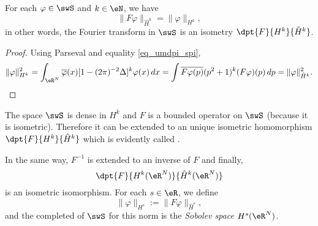 \begin{theorem}
For each $\varphi\in\swS$ and $k\in\eN$, we have
\[ 
  \| F\varphi \|_{\hat H^k}=\| \varphi \|_{H^k},
\]
in other words, the Fourier transform in $\swS$ is an isometry $\dpt{F}{ H^k }{ \hat H^k }$.

\end{theorem}


\begin{proof}
Using Parseval and equality \eqref{eq_umdpi_spi},
\begin{equation}
\| \varphi \|_{H^k}^2=\int_{\eR^N}\overline{ \varphi }(x)[1-(2\pi)^{-2}\Delta]^k\varphi(x)\,dx
		=\int \overline{ F\varphi(p) }(p^2+1)^k(F\varphi)(p)\,dp\\
		=\| \varphi \|_{\hat H^k}^2.
\end{equation}
\end{proof}
The space $\swS$ is dense in $H^k$ and $F$ is a bounded operator on $\swS$ (because it is isometric). Therefore it can be extended to an unique isometric homomorphism $\dpt{ F }{ H^k }{ \hat H^k }$ which is evidently called .


In the same way, $F^{-1}$ is extended to an inverse of $F$ and finally,
\[ 
  \dpt{ F }{ H^k(\eR^N) }{ \hat H^k(\eR^N) }
\]
is  an isometric isomorphism. For each $s\in\eR$, we define
\begin{equation}
  \| \varphi \|_{H^s}:=\| F\varphi \|_{\hat H^s},
\end{equation}
and the completed of $\swS$ for this norm is the \emph{Sobolev space} $H^s(\eR^N)$.
